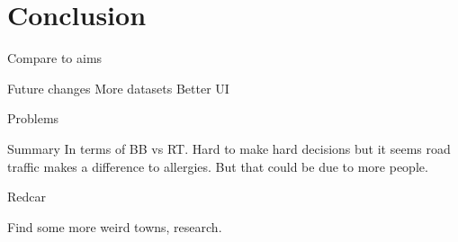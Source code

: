 \chapter{Conclusion}
\label{cha:conc}

Compare to aims

Future changes 
More datasets
Better UI

Problems

Summary
In terms of BB vs RT. Hard to make hard decisions but it seems road traffic makes a difference to allergies. But that could be due to more people.

Redcar

Find some more weird towns, research.